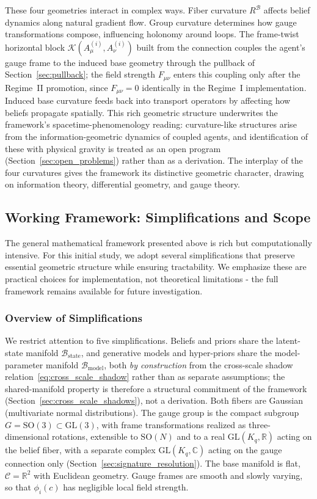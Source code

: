 \documentclass[11pt]{article}
\begin{document}
These four geometries interact in complex ways. Fiber curvature $R^\mathcal{B}$ affects belief dynamics along natural gradient flow. Group curvature determines how gauge transformations compose, influencing holonomy around loops. The frame-twist horizontal block $\mathcal{K}(A^{(i)}_\mu, A^{(i)}_\nu)$ built from the connection couples the agent's gauge frame to the induced base geometry through the pullback of Section~\ref{sec:pullback}; the field strength $F_{\mu\nu}$ enters this coupling only after the Regime~II promotion, since $F_{\mu\nu} = 0$ identically in the Regime~I implementation. Induced base curvature feeds back into transport operators by affecting how beliefs propagate spatially. This rich geometric structure underwrites the framework's spacetime-phenomenology reading: curvature-like structures arise from the information-geometric dynamics of coupled agents, and identification of these with physical gravity is treated as an open program (Section~\ref{sec:open_problems}) rather than as a derivation. The interplay of the four curvatures gives the framework its distinctive geometric character, drawing on information theory, differential geometry, and gauge theory.

\subsection{Working Framework: Simplifications and Scope}
\label{sec:working_framework}

The general mathematical framework presented above is rich but computationally intensive. For this initial study, we adopt several simplifications that preserve essential geometric structure while ensuring tractability. We emphasize these are practical choices for implementation, not theoretical limitations - the full framework remains available for future investigation.

\subsubsection{Overview of Simplifications}

We restrict attention to five simplifications. Beliefs and priors share the latent-state manifold $\mathcal{B}_{\mathrm{state}}$, and generative models and hyper-priors share the model-parameter manifold $\mathcal{B}_{\mathrm{model}}$, both \emph{by construction} from the cross-scale shadow relation~\eqref{eq:cross_scale_shadow} rather than as separate assumptions; the shared-manifold property is therefore a structural commitment of the framework (Section~\ref{sec:cross_scale_shadows}), not a derivation. Both fibers are Gaussian (multivariate normal distributions). The gauge group is the compact subgroup $G = \mathrm{SO}(3) \subset \mathrm{GL}(3)$, with frame transformations realized as three-dimensional rotations, extensible to $\mathrm{SO}(N)$ and to a real $\mathrm{GL}(K_q, \mathbb{R})$ acting on the belief fiber, with a separate complex $\mathrm{GL}(K_q, \mathbb{C})$ acting on the gauge connection only (Section~\ref{sec:signature_resolution}). The base manifold is flat, $\mathcal{C} = \mathbb{R}^2$ with Euclidean geometry. Gauge frames are smooth and slowly varying, so that $\phi_i(c)$ has negligible local field strength.
\end{document}
